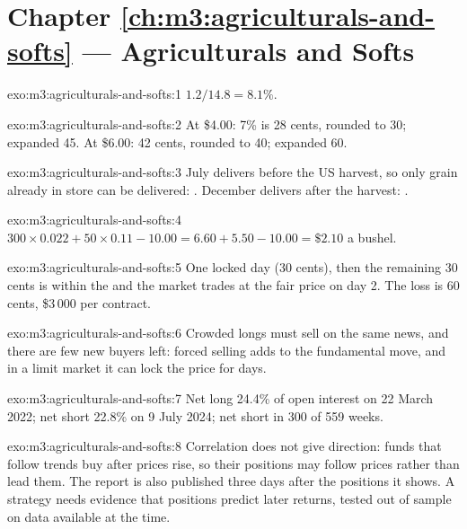 \section*{Chapter \ref{ch:m3:agriculturals-and-softs} --- Agriculturals and Softs}

\begin{solution}{exo:m3:agriculturals-and-softs:1}
$1.2/14.8 = 8.1\%$.
\end{solution}

\begin{solution}{exo:m3:agriculturals-and-softs:2}
At \$4.00: 7\% is 28 cents, rounded to 30; expanded 45. At \$6.00: 42 cents, rounded to 40; expanded 60.
\end{solution}

\begin{solution}{exo:m3:agriculturals-and-softs:3}
July delivers before the US harvest, so only grain already in store can be delivered: . December
delivers after the harvest: .
\end{solution}

\begin{solution}{exo:m3:agriculturals-and-softs:4}
$300 \times 0.022 + 50 \times 0.11 - 10.00 = 6.60 + 5.50 - 10.00 = \$2.10$ a bushel.
\end{solution}

\begin{solution}{exo:m3:agriculturals-and-softs:5}
One locked day (30 cents), then the remaining 30 cents is within the  and the market trades
at the fair price on day 2. The loss is 60 cents, \$3\,000 per contract.
\end{solution}

\begin{solution}{exo:m3:agriculturals-and-softs:6}
Crowded longs must sell on the same news, and there are few new buyers left: forced selling adds to the
fundamental move, and in a limit market it can lock the price for days.
\end{solution}

\begin{solution}{exo:m3:agriculturals-and-softs:7}
Net long 24.4\% of open interest on 22 March 2022; net short 22.8\% on 9 July 2024; net short in 300 of 559
weeks.
\end{solution}

\begin{solution}{exo:m3:agriculturals-and-softs:8}
Correlation does not give direction: funds that follow trends buy after prices rise, so their positions
may follow prices rather than lead them. The report is also published three days after the positions it
shows. A strategy needs evidence that positions predict later returns, tested out of sample on data
available at the time.
\end{solution}

